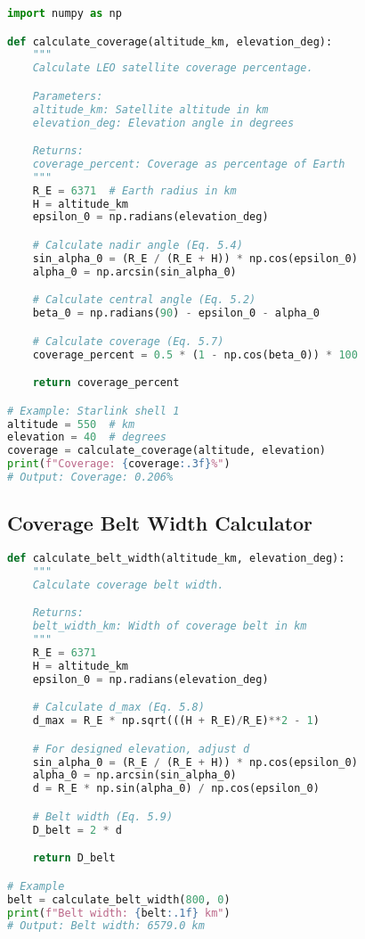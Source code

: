 \documentclass[11pt,letterpaper]{article}
\begin{document}
\begin{lstlisting}[language=Python, basicstyle=\small, frame=single]
import numpy as np

def calculate_coverage(altitude_km, elevation_deg):
    """
    Calculate LEO satellite coverage percentage.

    Parameters:
    altitude_km: Satellite altitude in km
    elevation_deg: Elevation angle in degrees

    Returns:
    coverage_percent: Coverage as percentage of Earth
    """
    R_E = 6371  # Earth radius in km
    H = altitude_km
    epsilon_0 = np.radians(elevation_deg)

    # Calculate nadir angle (Eq. 5.4)
    sin_alpha_0 = (R_E / (R_E + H)) * np.cos(epsilon_0)
    alpha_0 = np.arcsin(sin_alpha_0)

    # Calculate central angle (Eq. 5.2)
    beta_0 = np.radians(90) - epsilon_0 - alpha_0

    # Calculate coverage (Eq. 5.7)
    coverage_percent = 0.5 * (1 - np.cos(beta_0)) * 100

    return coverage_percent

# Example: Starlink shell 1
altitude = 550  # km
elevation = 40  # degrees
coverage = calculate_coverage(altitude, elevation)
print(f"Coverage: {coverage:.3f}%")
# Output: Coverage: 0.206%
\end{lstlisting}

\subsection{Coverage Belt Width Calculator}

\begin{lstlisting}[language=Python, basicstyle=\small, frame=single]
def calculate_belt_width(altitude_km, elevation_deg):
    """
    Calculate coverage belt width.

    Returns:
    belt_width_km: Width of coverage belt in km
    """
    R_E = 6371
    H = altitude_km
    epsilon_0 = np.radians(elevation_deg)

    # Calculate d_max (Eq. 5.8)
    d_max = R_E * np.sqrt(((H + R_E)/R_E)**2 - 1)

    # For designed elevation, adjust d
    sin_alpha_0 = (R_E / (R_E + H)) * np.cos(epsilon_0)
    alpha_0 = np.arcsin(sin_alpha_0)
    d = R_E * np.sin(alpha_0) / np.cos(epsilon_0)

    # Belt width (Eq. 5.9)
    D_belt = 2 * d

    return D_belt

# Example
belt = calculate_belt_width(800, 0)
print(f"Belt width: {belt:.1f} km")
# Output: Belt width: 6579.0 km
\end{lstlisting}
\end{document}
